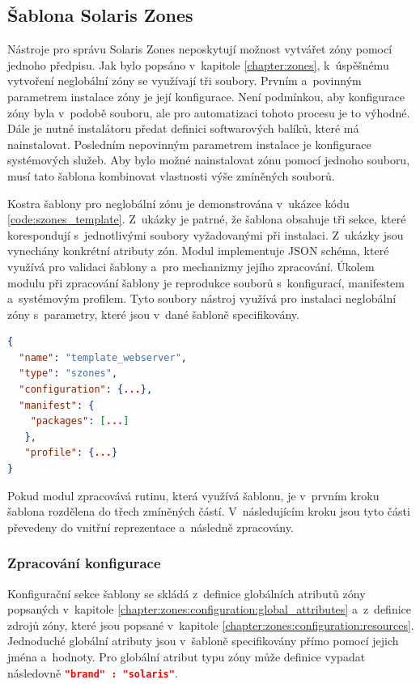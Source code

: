 \subsection{Šablona Solaris Zones}
\label{chapter:implementation:szones:template}
Nástroje pro správu Solaris Zones neposkytují možnost vytvářet zóny pomocí jednoho předpisu. Jak bylo popsáno v~kapitole
\ref{chapter:zones}, k~úspěšnému vytvoření neglobální zóny se využívají tři soubory. Prvním a~povinným parametrem instalace zóny
je její konfigurace. Není podmínkou, aby konfigurace zóny byla v~podobě souboru, ale pro automatizaci tohoto procesu je to výhodné.
Dále je nutné instalátoru předat definici softwarových balíků, které má nainstalovat. Posledním nepovinným parametrem instalace
je konfigurace systémových služeb. Aby bylo možné nainstalovat zónu pomocí jednoho souboru, musí tato šablona kombinovat
vlastnosti výše zmíněných souborů. 

Kostra šablony pro neglobální zónu je demonstrována v~ukázce kódu \ref{code:szones_template}. Z~ukázky je patrné, že šablona obsahuje
tři sekce, které korespondují s~jednotlivými soubory vyžadovanými při instalaci. Z~ukázky jsou vynechány konkrétní atributy zón.
Modul implementuje JSON schéma, které využívá pro validaci šablony a~pro mechanizmy jejího zpracování. Úkolem modulu při zpracování
šablony je reprodukce souborů s~konfigurací, manifestem a~systémovým profilem. Tyto soubory nástroj využívá pro instalaci 
neglobální zóny s~parametry, které jsou v~dané šabloně specifikovány.
\begin{lstlisting}[language=json, caption={Kostra šablony neglobální zóny}, float,label={code:szones_template}]  
{  
  "name": "template_webserver",
  "type": "szones",
  "configuration": {...},
  "manifest": {
    "packages": [...]
   },
   "profile": {...} 
}
\end{lstlisting}
Pokud modul zpracovává rutinu, která využívá šablonu, je v~prvním kroku šablona rozdělena do třech zmíněných částí.
V~následujícím kroku jsou tyto části převedeny do vnitřní reprezentace a~následně zpracovány.
\subsubsection{Zpracování konfigurace}
\label{chapter:implementation:szones:template:configuration}
Konfigurační sekce šablony se skládá z~definice globálních atributů zóny popsaných v~kapitole \ref{chapter:zones:configuration:global_attributes}
a~z~definice zdrojů zóny, které jsou popsané v~kapitole \ref{chapter:zones:configuration:resources}. Jednoduché globální atributy
jsou v~šabloně specifikovány přímo pomocí jejich jména a~hodnoty. Pro globální atribut typu zóny může definice vypadat 
následovně \lstinline[language=json]{"brand" : "solaris"}.

